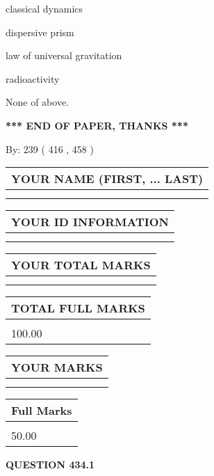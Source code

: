\documentclass[12pt]{article}
\begin{document}
 
classical dynamics
 
 
dispersive prism
 
 
law of universal gravitation
 
 
radioactivity
 
 
 None of above.
 
 
   
   
\vspace{1.0in} 
{\textbf{\large{ *** END OF PAPER, THANKS *** }}} 
   
   
\hspace{1.0in} By: 
 239 ( 416 ,  458 )
   
   
   
   
\newpage 
\setcounter{page}{ 
   434001 } 
   
   
   
   
\noindent\begin{tabular}{|l|}
\hline
YOUR NAME (FIRST, ... LAST)  \\
\hline
 \\ 
 \\ 
\hline
\end{tabular}
\hspace{0.05in} \begin{tabular}{|l|}
\hline
 YOUR   ID   INFORMATION  \\
\hline
 \\ 
 \\ 
\hline
\end{tabular}
   
   
\vspace{0.2in}\noindent\begin{tabular}{|l|}
\hline
YOUR TOTAL MARKS  \\
\hline
 \\ 
 \\ 
\hline
\end{tabular}
\hspace{0.05in} \begin{tabular}{|l|}
\hline
TOTAL FULL MARKS  \\
\hline
 \\ 
100.00 \\
\hline
\end{tabular}
  
\vspace{0.2in}
  
\noindent\begin{tabular}{|l|}
\hline
 YOUR MARKS  \\
\hline
 \\ 
 \\ 
\hline
\end{tabular}
\hspace{0.05in} \begin{tabular}{|l|}
\hline
 Full Marks  \\
\hline
 \\ 
50.00 \\
\hline
\end{tabular}
{\textbf{\Large{QUESTION
434.1 
}}}
  
\end{document}
